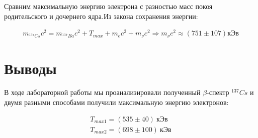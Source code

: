 \documentclass[a4paper,12pt]{article}
\begin{document}
Сравним максимальную энергию электрона с разностью масс покоя родительского и дочернего ядра.Из закона сохранения энергии:

\begin{align*}
	m_{^{137}Cs}c^2 = m_{^{137}Ba}c^2 + T_{max} +  m_e c^2 + m_{\nu} c^2 \Rightarrow m_{\nu}c^2 \approx (751 \pm 107) кЭв
\end{align*}

\section*{Выводы}

В ходе лабораторной работы мы проанализировали полученный $\beta$-спектр $^{137}Cs$ и двумя разными способами получили максимальную энергию электронов:

\begin{align*}
	T_{max1} = (535 \pm 40) \ кЭв \\
	T_{max2} = (698 \pm 100) \ кЭв
\end{align*}
\end{document}
